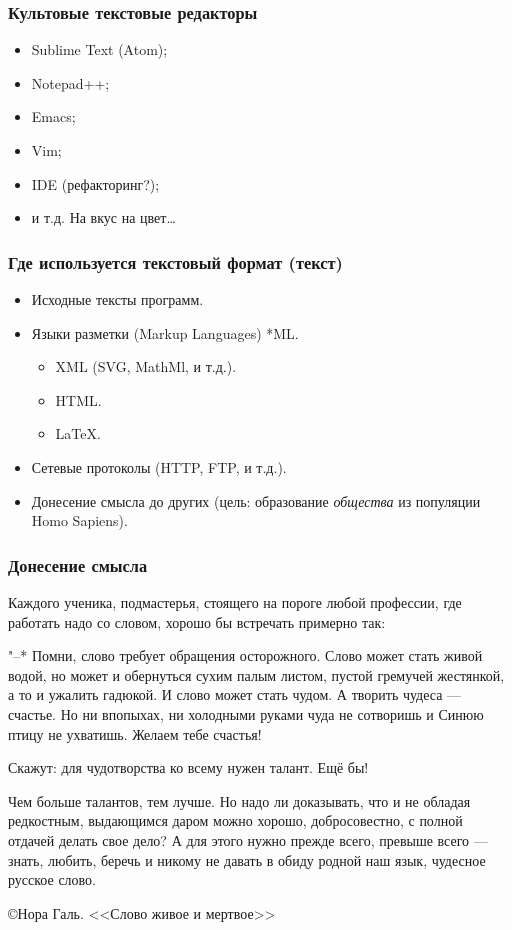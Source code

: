 \begin{frame}
    \frametitle{Культовые текстовые редакторы}

    \begin{itemize}
        \item Sublime Text (Atom);
        \item Notepad++;
        \item Emacs;
        \item Vim;
        \item IDE (рефакторинг?);
        \item и т.д. На вкус на цвет\ldots
    \end{itemize}
\end{frame}

\begin{frame}
    \frametitle{Где используется текстовый формат (текст)}

    \begin{itemize}
        \item Исходные тексты программ.
        \item Языки разметки (Markup Languages) *ML.
        \begin{itemize}
            \item XML (SVG, MathMl, и т.д.).
            \item HTML.
            \item LaTeX.
        \end{itemize}
        \item Сетевые протоколы (HTTP, FTP, и т.д.).
        \item Донесение смысла до других (цель: образование \emph{общества} из популяции Homo Sapiens).
    \end{itemize}
\end{frame}

\begin{frame}
    \frametitle{Донесение смысла}

    Каждого ученика, подмастерья, стоящего на пороге любой профессии, где работать надо со словом, хорошо бы встречать примерно так:
    
    "--* Помни, слово требует обращения осторожного. Слово может стать живой водой, но может и обернуться сухим палым листом, пустой гремучей жестянкой, а то и ужалить гадюкой. И слово может стать чудом. А творить чудеса --- счастье. Но ни впопыхах, ни холодными руками чуда не сотворишь и Синюю птицу не ухватишь. Желаем тебе счастья!
    
    Скажут: для чудотворства ко всему нужен талант. Ещё бы!
    
    Чем больше талантов, тем лучше. Но надо ли доказывать, что и не обладая редкостным, выдающимся даром можно хорошо, добросовестно, с полной отдачей делать свое дело? А для этого нужно прежде всего, превыше всего --- знать, любить, беречь и никому не давать в обиду родной наш язык, чудесное русское слово.
    
    \begin{flushright}
        \copyright Нора Галь. <<Слово живое и мертвое>>
    \end{flushright}
\end{frame}

